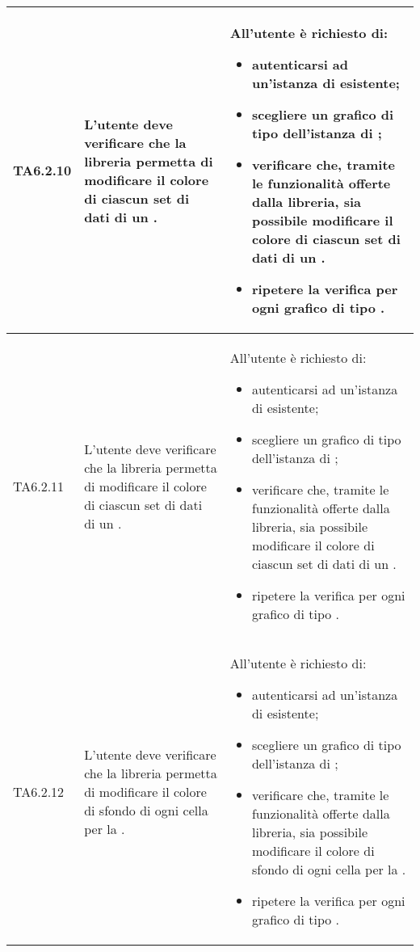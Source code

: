 \begin{longtabu}{| X[0.5] | X | X |}
	TA6.2.10 & L'utente  deve verificare che la libreria permetta di modificare il colore di ciascun set di dati di un .
		
		& All'utente  è richiesto di:
		\begin{itemize}
			\item autenticarsi ad un'istanza di \projectname{} esistente;
			\item scegliere un grafico di tipo  dell'istanza di \projectname{};
			\item verificare che, tramite le funzionalità offerte dalla libreria, sia possibile modificare il colore di ciascun set di dati di un .
			\item ripetere la verifica per ogni grafico di tipo .
		\end{itemize}
\\ \hline

	TA6.2.11 & L'utente  deve verificare che la libreria permetta di modificare il colore di ciascun set di dati di un .
		
		& All'utente  è richiesto di:
		\begin{itemize}
			\item autenticarsi ad un'istanza di \projectname{} esistente;
			\item scegliere un grafico di tipo  dell'istanza di \projectname{};
			\item verificare che, tramite le funzionalità offerte dalla libreria, sia possibile modificare il colore di ciascun set di dati di un .
			\item ripetere la verifica per ogni grafico di tipo .
		\end{itemize}
\\ \hline

	TA6.2.12 & L'utente  deve verificare che la libreria permetta di modificare il colore di sfondo di ogni cella per la .
		
		& All'utente  è richiesto di:
		\begin{itemize}
			\item autenticarsi ad un'istanza di \projectname{} esistente;
			\item scegliere un grafico di tipo  dell'istanza di \projectname{};
			\item verificare che, tramite le funzionalità offerte dalla libreria, sia possibile modificare il colore di sfondo di ogni cella per la .
			\item ripetere la verifica per ogni grafico di tipo .
		\end{itemize}
\\ \hline


\end{longtabu}
